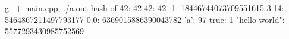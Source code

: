 {\small \begin{console} g++ main.cpp; ./a.out
hash of
42: 42
42: 42
-1: 18446744073709551615
3.14: 5464867211497793177
0.0: 6369015886390043782
'a': 97
true: 1
"hello world": 5577293430985752569
\end{console}
}
